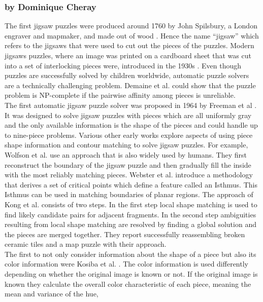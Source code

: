 \documentclass[]{report}
\begin{document}
\subsubsection*{by Dominique Cheray}
The first jigsaw puzzles were produced around 1760 by John Spilsbury, a
London engraver and mapmaker, and made out of wood \cite{sholomon2013genetic}.
Hence the name ``jigsaw'' which refers to the jigsaws that were used to cut out
the pieces of the puzzles. Modern jigsaws puzzles, where an image was printed on
a cardboard sheet that was cut into a set of interlocking pieces were, introduced
in the 1930s \cite{williams2004jigsaw}. Even though puzzles are successfully
solved by children worldwide, automatic puzzle solvers are a technically
challenging problem. Demaine et al. \cite{demaine2007jigsaw} could show that the
puzzle problem is NP-complete if the pairwise affinity among pieces is
unreliable. \\
The first automatic jigsaw puzzle solver was proposed in 1964 by Freeman et al
\cite{freeman1964apictorial}. It was designed to solve jigsaw puzzles with
pieces which are all uniformly gray and the only available information is the
shape of the pieces and could handle up to nine-piece problems. Various other
early works explore aspects of using piece shape information and contour
matching to solve jigsaw puzzles. For example, Wolfson et al. \cite{wolfson1988solving}
use an approach that is also widely used by humans. They first reconstruct the boundary of
the jigsaw puzzle and then gradually fill the inside with the most reliably matching
pieces. Webster et al. \cite{webster1990computer} introduce a methodology that
derives a set of critical points which define a feature called an Isthmus. This
Isthmus can be used in matching boundaries of planar regions. The approach of
Kong et al. \cite{kong2001solving} consists of two steps. In the first step
local shape matching is used to find likely candidate pairs for adjacent
fragments. In the second step ambiguities resulting from local shape matching
are resolved by finding a global solution and the pieces are merged together.
They report successfully reassembling broken ceramic tiles and a map puzzle with
their approach. \\
The first to not only consider information about the shape of a piece but also
its color information were Kosiba et al. \cite{kosiba1994automatic}. The color
information is used differently depending on whether the original image is known
or not. If the original image is known they calculate the overall color
characteristic of each piece, meaning the mean and variance of the hue,
\end{document}
